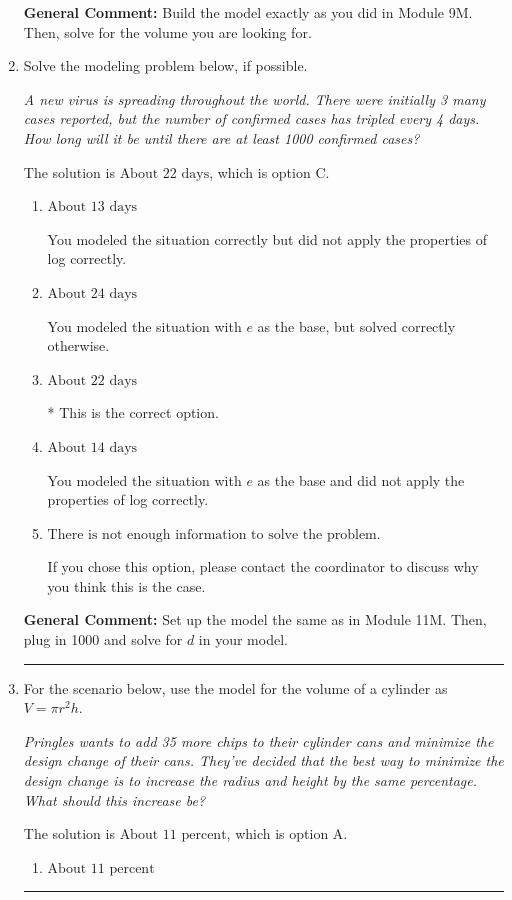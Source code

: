 \documentclass{extbook}[14pt]
\newcommand{\litem}[1]{\item #1

\rule{\textwidth}{0.4pt}}
\begin{document}
\begin{enumerate}
{\textbf{General Comment:} Build the model exactly as you did in Module 9M. Then, solve for the volume you are looking for.
}
\litem{
Solve the modeling problem below, if possible.

\begin{center}
    \textit{ A new virus is spreading throughout the world. There were initially 3 many cases reported, but the number of confirmed cases has tripled every 4 days. How long will it be until there are at least 1000 confirmed cases? }
\end{center}


The solution is \( \text{About } 22 \text{ days} \), which is option C.\begin{enumerate}[label=\Alph*.]
\item \( \text{About } 13 \text{ days} \)

You modeled the situation correctly but did not apply the properties of log correctly.
\item \( \text{About } 24 \text{ days} \)

You modeled the situation with $e$ as the base, but solved correctly otherwise.
\item \( \text{About } 22 \text{ days} \)

* This is the correct option.
\item \( \text{About } 14 \text{ days} \)

You modeled the situation with $e$ as the base and did not apply the properties of log correctly.
\item \( \text{There is not enough information to solve the problem.} \)

If you chose this option, please contact the coordinator to discuss why you think this is the case.
\end{enumerate}

\textbf{General Comment:} Set up the model the same as in Module 11M. Then, plug in 1000 and solve for $d$ in your model.
}
\litem{
For the scenario below, use the model for the volume of a cylinder as $V = \pi r^2 h$.

\begin{center}
    \textit{ Pringles wants to add 35 \text{percent} more chips to their cylinder cans and minimize the design change of their cans. They've decided that the best way to minimize the design change is to increase the radius and height by the same percentage. What should this increase be? }
\end{center}


The solution is \( \text{About } 11 \text{ percent} \), which is option A.\begin{enumerate}[label=\Alph*.]
\item \( \text{About } 11 \text{ percent} \)


\end{enumerate}}
\end{enumerate}
\end{document}
